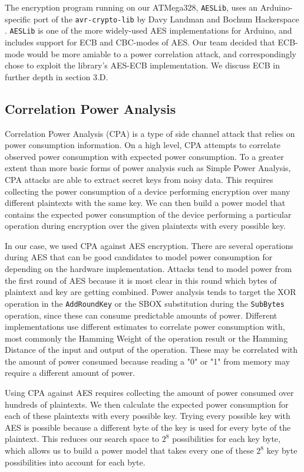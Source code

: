 \documentclass[journal]{ieee_style}
\begin{document}
The encryption program running on our ATMega328, \texttt{AESLib}, uses an Arduino-specific port of the \texttt{avr-crypto-lib} by Davy Landman and Bochum Hackerspace \cite{AESLib} \cite{daslabor}. \texttt{AESLib} is one of the more widely-used AES implementations for Arduino, and includes support for ECB and CBC-modes of AES. Our team decided that ECB-mode would be more amiable to a power correlation attack, and correspondingly chose to exploit the library's AES-ECB implementation. We discuss ECB in further depth in section 3.D.

\subsection{Correlation Power Analysis}
Correlation Power Analysis (CPA) is a type of side channel attack that relies on power consumption information. On a high level, CPA attempts to correlate observed power consumption with expected power consumption. To a greater extent than more basic forms of power analysis such as Simple Power Analysis, CPA attacks are able to extract secret keys from noisy data. This requires collecting the power consumption of a device performing encryption over many different plaintexts with the same key. We can then build a power model that contains the expected power consumption of the device performing a particular operation during encryption over the given plaintexts with every possible key. 

In our case, we used CPA against AES encryption. There are several operations during AES that can be good candidates to model power consumption for depending on the hardware implementation. Attacks tend to model power from the first round of AES because it is most clear in this round which bytes of plaintext and key are getting combined. Power analysis tends to target the XOR operation in the \texttt{AddRoundKey} or the SBOX substitution during the \texttt{SubBytes} operation, since these can consume predictable amounts of power. Different implementations use different estimates to correlate power consumption with, most commonly the Hamming Weight of the operation result or the Hamming Distance of the input and output of the operation. These may be correlated with the amount of power consumed because reading a "0" or "1" from memory may require a different amount of power.
 
Using CPA against AES requires collecting the amount of power consumed over hundreds of plaintexts. We then calculate the expected power consumption for each of these plaintexts with every possible key. Trying every possible key with AES is possible because a different byte of the key is used for every byte of the plaintext. This reduces our search space to $2^8$ possibilities for each key byte, which allows us to build a power model that takes every one of these $2^8$ key byte possibilities into account for each byte. 
\end{document}
